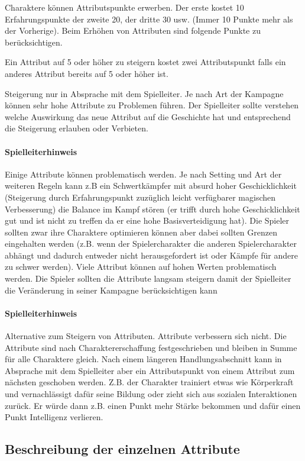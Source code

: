 \documentclass{article}
\begin{document}
Charaktere können Attributspunkte erwerben. Der erste kostet 10 Erfahrungspunkte der zweite 20, der dritte 30 usw.
(Immer 10 Punkte mehr als der Vorherige). Beim Erhöhen von Attributen sind folgende Punkte zu berücksichtigen.

Ein Attribut auf 5 oder höher zu steigern kostet zwei Attributspunkt falls ein anderes Attribut bereits auf 5
oder höher ist.

Steigerung nur in Absprache mit dem Spielleiter. Je nach Art der Kampagne können sehr hohe Attribute zu Problemen
führen. Der Spielleiter sollte verstehen welche Auswirkung das neue Attribut auf die Geschichte hat und entsprechend
die Steigerung erlauben oder Verbieten.

\begin{mdframed}[hidealllines=true, backgroundcolor=black!10]
\paragraph{Spielleiterhinweis}

Einige Attribute können problematisch werden. Je nach Setting und Art der weiteren Regeln kann z.B ein
Schwertkämpfer mit absurd hoher Geschicklichkeit (Steigerung durch Erfahrungspunkt zuzüglich leicht verfügbarer
magischen Verbesserung) die Balance im Kampf stören (er trifft durch hohe Geschicklichkeit gut und ist nicht zu
treffen da er eine hohe Basisverteidigung hat). Die Spieler sollten zwar ihre Charaktere optimieren können aber
dabei sollten Grenzen eingehalten werden (z.B. wenn der Spielercharakter die anderen Spielercharakter abhängt und
dadurch entweder nicht herausgefordert ist oder Kämpfe für andere zu schwer werden). Viele Attribut können auf
hohen Werten problematisch werden. Die Spieler sollten die Attribute langsam steigern damit der Spielleiter die
Veränderung in seiner Kampagne berücksichtigen kann

\end{mdframed}
\begin{mdframed}[hidealllines=true, backgroundcolor=black!10]
\paragraph{Spielleiterhinweis}

Alternative zum Steigern von Attributen. Attribute verbessern sich nicht.
Die Attribute sind nach Charaktererschaffung festgeschrieben und bleiben in Summe für alle Charaktere gleich.
Nach einem längeren Handlungsabschnitt kann in Absprache mit dem Spielleiter aber ein Attributspunkt von einem
Attribut zum nächsten geschoben werden. Z.B. der Charakter trainiert etwas wie Körperkraft und vernachlässigt dafür
seine Bildung oder zieht sich aus sozialen Interaktionen zurück. Er würde dann z.B. einen Punkt mehr Stärke bekommen
und dafür einen Punkt Intelligenz verlieren.

\end{mdframed}
\begin{center}
\subsection{Beschreibung der einzelnen Attribute}
\end{center}
\end{document}
